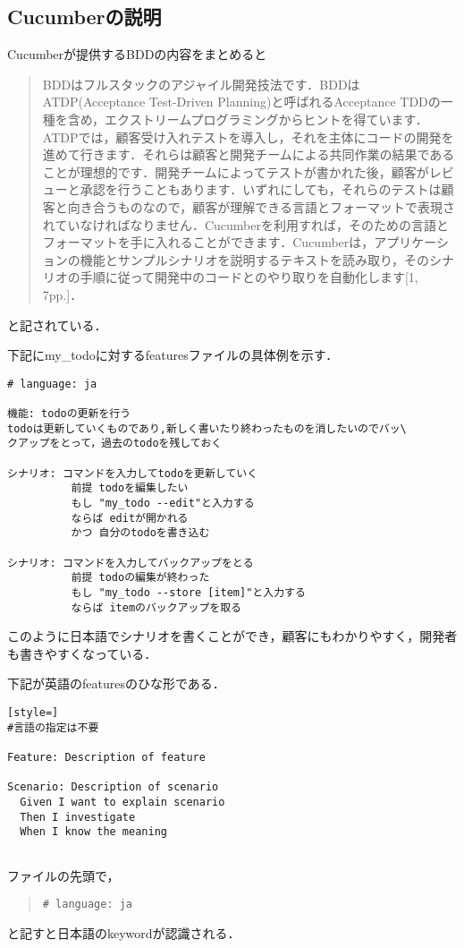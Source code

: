 
\subsection{Cucumberの説明}
Cucumberが提供するBDDの内容をまとめると

\begin{quotation}
BDDはフルスタックのアジャイル開発技法です．BDDはATDP(Acceptance Test-Driven Planning)と呼ばれるAcceptance TDDの一種を含め，エクストリームプログラミングからヒントを得ています．ATDPでは，顧客受け入れテストを導入し，それを主体にコードの開発を進めて行きます．それらは顧客と開発チームによる共同作業の結果であることが理想的です．開発チームによってテストが書かれた後，顧客がレビューと承認を行うこともあります．いずれにしても，それらのテストは顧客と向き合うものなので，顧客が理解できる言語とフォーマットで表現されていなければなりません．Cucumberを利用すれば，そのための言語とフォーマットを手に入れることができます．Cucumberは，アプリケーションの機能とサンプルシナリオを説明するテキストを読み取り，そのシナリオの手順に従って開発中のコードとのやり取りを自動化します[1, 7pp.]．

\end{quotation}
と記されている．

下記にmy\_todoに対するfeaturesファイルの具体例を示す．
\begin{lstlisting}[style=customRuby]
# language: ja

機能: todoの更新を行う
todoは更新していくものであり,新しく書いたり終わったものを消したいのでバッ\
クアップをとって，過去のtodoを残しておく

シナリオ: コマンドを入力してtodoを更新していく
          前提 todoを編集したい
          もし "my_todo --edit"と入力する
          ならば editが開かれる
          かつ 自分のtodoを書き込む

シナリオ: コマンドを入力してバックアップをとる
          前提 todoの編集が終わった
          もし "my_todo --store [item]"と入力する
          ならば itemのバックアップを取る
\end{lstlisting}
このように日本語でシナリオを書くことができ，顧客にもわかりやすく，開発者も書きやすくなっている．

下記が英語のfeaturesのひな形である．
\begin{lstlisting}[style=]
#言語の指定は不要

Feature: Description of feature

Scenario: Description of scenario
  Given I want to explain scenario
  Then I investigate
  When I know the meaning
  
\end{lstlisting}
ファイルの先頭で，
\begin{quote}\begin{verbatim}
# language: ja
\end{verbatim}\end{quote}
と記すと日本語のkeywordが認識される．


